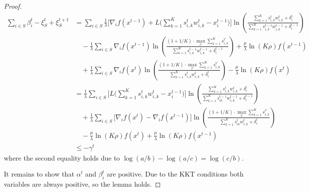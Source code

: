 \begin{proof}
\begin{align*}
    \sum_{i \in S}\beta_{i}^{t} - \xi_{S}^{t} + \xi_{S}^{t+1}  & = \sum_{i \in S} \frac{1}{\lambda} \biggl[  \nabla_{i} f(x^{t-1}) + L\biggl( \sum_{k=1}^{K} s_{i,k}^{t} w_{i,k}^{t}  - x_{i}^{t-1} \biggr) \biggr] \ln \left( \frac{\sum_{k=1}^{K} s_{i,k}^{t} w_{i,k}^{t} + \delta_{i}^{t}}{\sum_{k=1}^{K}  s_{i,k}^{t-1}w_{i,k}^{t-1}  + \delta_{i}^{t-1}} \right) \\
        & \quad - \frac{1}{\lambda} \sum_{i \in S} \nabla_{i} f(x^{t-1}) \ln \left( \frac{(1 + 1/K) \cdot \max_{t'} \sum_{k=1}^{K} s_{i,k}^{t'}}{\sum_{k=1}^{K}  s_{i,k}^{t-1}w_{i,k}^{t-1}  + \delta_{i}^{t-1}} \right) + \frac{\mu}{\lambda} \ln(K\rho)  f(x^{t-1}) \\
        & \quad + \frac{1}{\lambda} \sum_{i \in S} \nabla_{i} f(x^{t}) \ln \left( \frac{(1 + 1/K) \cdot \max_{t'} \sum_{k=1}^{K} s_{i,k}^{t'}}{\sum_{k=1}^{K}  s_{i,k}^{t}w_{i,k}^{t}  + \delta_{i}^{t}} \right) - \frac{\mu}{\lambda} \ln(K\rho)  f(x^{t}) \\
    & =     \frac{1}{\lambda} \sum_{i \in S} \biggl[ L\biggl( \sum_{k=1}^{K} s_{i,k}^{t} w_{i,k}^{t}  - x_{i}^{t-1} \biggr) \biggr]  \ln \left( \frac{\sum_{k=1}^{K} s_{i,k}^{t} w_{i,k}^{t} + \delta_{i}^{t}}{\sum_{k=1}^{K}  s_{ik}^{t-1}w_{i,k}^{t-1}  + \delta_{i}^{t-1}} \right) \\
            & \quad + \frac{1}{\lambda} \sum_{i \in S} \biggl[ \nabla_{i} f(x^{t}) - \nabla_{i} f(x^{t-1}) \biggr] \ln \left( \frac{(1 + 1/K) \cdot \max_{t'} \sum_{k=1}^{K} s_{i,k}^{t'}}{\sum_{k=1}^{K}  s_{ik}^{t}w_{i,k}^{t}  + \delta_{i}^{t}} \right)  \\
            & \quad - \frac{\mu}{\lambda} \ln(K\rho) f(x^{t}) + \frac{\mu}{\lambda} \ln(K\rho) f(x^{t-1}) \\
    & \leq - \gamma^t
\end{align*}
where the second equality holds due to $\log(a/b) - \log(a/c) = \log(c/b)$.

It remains to show that $\alpha^t$ and $\beta_i^t$ are positive. Due to the KKT conditions both variables are always positive, so the lemma holds.
\end{proof}

\clearpage

